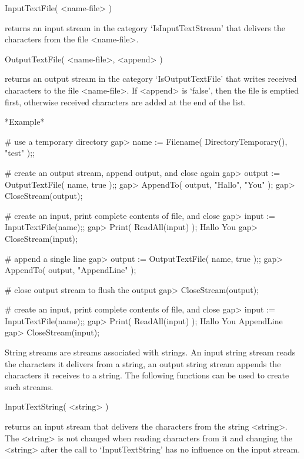\>InputTextFile( <name-file> )

returns an input stream in the category `IsInputTextStream' that delivers
the characters from the file <name-file>.

\>OutputTextFile( <name-file>, <append> )

returns  an output stream  in the category `IsOutputTextFile' that writes
received characters  to the file   <name-file>.  If <append> is  `false',
then the  file is emptied first,  otherwise received characters are added
at the end of the list.

*Example*

\begintt
    # use a temporary directory
    gap> name := Filename( DirectoryTemporary(), "test" );;

    # create an output stream, append output, and close again
    gap> output := OutputTextFile( name, true );;
    gap> AppendTo( output, "Hallo\n", "You\n" );
    gap> CloseStream(output);

    # create an input, print complete contents of file, and close
    gap> input := InputTextFile(name);;
    gap> Print( ReadAll(input) );
    Hallo
    You
    gap> CloseStream(input);

    # append a single line
    gap> output := OutputTextFile( name, true );; 
    gap> AppendTo( output, "AppendLine\n" );

    # close output stream to flush the output
    gap> CloseStream(output);

    
    # create an input, print complete contents of file, and close
    gap> input := InputTextFile(name);;
    gap> Print( ReadAll(input) );
    Hallo
    You
    AppendLine
    gap> CloseStream(input);
\endtt


String streams   are streams associated  with   strings.  An input string
stream reads  the characters it delivers  from a string, an output string
stream  appends the characters  it receives  to  a string.  The following
functions can be used to create such streams.

\>InputTextString( <string> )

returns an  input stream that  delivers the  characters  from the  string
<string>.  The  <string> is not changed when  reading characters  from it
and  changing  the <string> after  the  call to `InputTextString'  has no
influence on the input stream.


